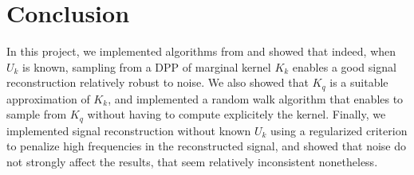 \documentclass{article}
\begin{document}
	
\clearpage
\section{Conclusion}


In this project, we implemented algorithms from \cite{tremblay2017} and showed that indeed, when $U_k$ is known, sampling from a DPP of marginal kernel $K_k$ enables a good signal reconstruction relatively robust to noise. We also showed that $K_q$ is a suitable approximation of $K_k$, and implemented a random walk algorithm that enables to sample from $K_q$ without having to compute explicitely the kernel. Finally, we implemented signal reconstruction without known $U_k$ using a regularized criterion to penalize high frequencies in the reconstructed signal, and showed that noise do not strongly affect the results, that seem relatively inconsistent nonetheless.


 

\end{document}
